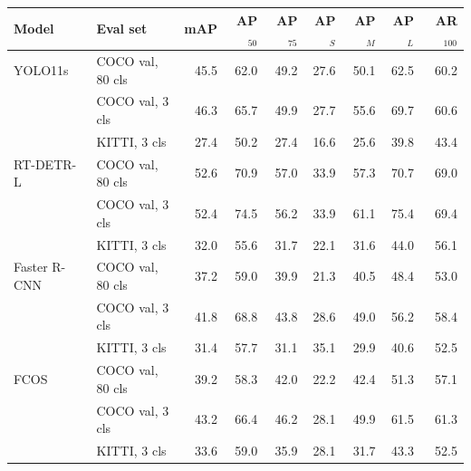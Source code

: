 \begin{tabular}{llrrrrrrr}
\toprule
Model & Eval set & mAP & AP$_{50}$ & AP$_{75}$ & AP$_S$ & AP$_M$ & AP$_L$ & AR$_{100}$ \\
\midrule
YOLO11s & COCO val, 80 cls & 45.5 & 62.0 & 49.2 & 27.6 & 50.1 & 62.5 & 60.2 \\
 & COCO val, 3 cls & 46.3 & 65.7 & 49.9 & 27.7 & 55.6 & 69.7 & 60.6 \\
 & KITTI, 3 cls & 27.4 & 50.2 & 27.4 & 16.6 & 25.6 & 39.8 & 43.4 \\
\midrule
RT-DETR-L & COCO val, 80 cls & 52.6 & 70.9 & 57.0 & 33.9 & 57.3 & 70.7 & 69.0 \\
 & COCO val, 3 cls & 52.4 & 74.5 & 56.2 & 33.9 & 61.1 & 75.4 & 69.4 \\
 & KITTI, 3 cls & 32.0 & 55.6 & 31.7 & 22.1 & 31.6 & 44.0 & 56.1 \\
\midrule
Faster R-CNN & COCO val, 80 cls & 37.2 & 59.0 & 39.9 & 21.3 & 40.5 & 48.4 & 53.0 \\
 & COCO val, 3 cls & 41.8 & 68.8 & 43.8 & 28.6 & 49.0 & 56.2 & 58.4 \\
 & KITTI, 3 cls & 31.4 & 57.7 & 31.1 & 35.1 & 29.9 & 40.6 & 52.5 \\
\midrule
FCOS & COCO val, 80 cls & 39.2 & 58.3 & 42.0 & 22.2 & 42.4 & 51.3 & 57.1 \\
 & COCO val, 3 cls & 43.2 & 66.4 & 46.2 & 28.1 & 49.9 & 61.5 & 61.3 \\
 & KITTI, 3 cls & 33.6 & 59.0 & 35.9 & 28.1 & 31.7 & 43.3 & 52.5 \\
\bottomrule
\end{tabular}
